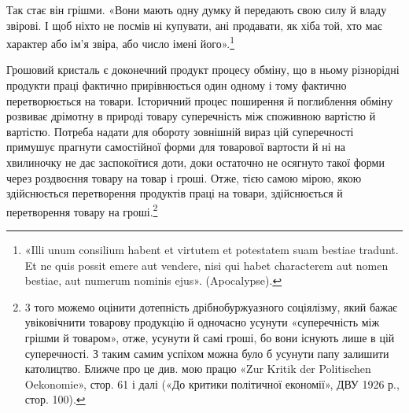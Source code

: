 \parcont{}  %
Так стає він грішми. «Вони мають одну думку й передають свою
силу й владу звірові. І щоб ніхто не посмів ні купувати, ані
продавати, як хіба той, хто має характер або ім’я звіра, або число
імені його».\footnote*{
«Illi unum consilium habent et virtutem et potestatem suam bestiae
tradunt. Et ne quis possit emere aut vendere, nisi qui habet characterem
aut nomen bestiae, aut numerum nominis ejus». (Apocalypse).
}

Грошовий кристаль є доконечний продукт процесу обміну,
що в ньому різнорідні продукти праці фактично прирівнюється
один одному і тому фактично перетворюється на товари. Історичний
процес поширення й поглиблення обміну розвиває дрімотну
в природі товару суперечність між споживною вартістю й вартістю.
Потреба надати для обороту зовнішній вираз цій суперечності
примушує прагнути самостійної форми для товарової вартости
й ні на хвилиночку не дає заспокоїтися доти, доки остаточно
не осягнуто такої форми через роздвоєння товару на товар і
гроші. Отже, тією самою мірою, якою здійснюється перетворення
продуктів праці на товари, здійснюється й перетворення товару
на гроші.\footnote{
3 того можемо оцінити дотепність дрібнобуржуазного соціялізму,
який бажає увіковічнити товарову продукцію й одночасно усунути «суперечність
між грішми й товаром», отже, усунути й самі гроші, бо вони
існують лише в цій суперечності. З таким самим успіхом можна було б
усунути папу залишити католицтво. Ближче про це див. мою працю «Zur
Kritik der Politischen Oekonomie», стор. 61 і далі («До критики політичної
економії», ДВУ 1926 р., стор. 100).
}

